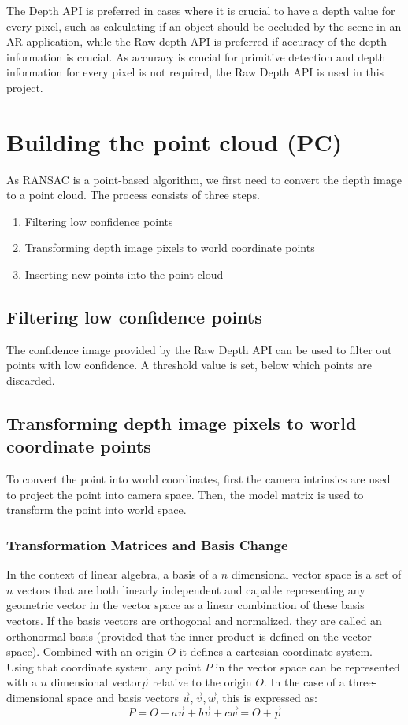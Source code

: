 

The Depth API is preferred in cases where it is crucial to have a depth value for every pixel, such as calculating if an object should be occluded by the scene in an AR application,
while the Raw depth API is preferred if accuracy of the depth information is crucial. \parencite{google_llc_arcore_doc}
As accuracy is crucial for primitive detection and depth information for every pixel is not required, the Raw Depth API is used in this project.


\section{Building the point cloud (PC)}
As RANSAC is a point-based algorithm, we first need to convert the depth image to a point cloud.
The process consists of three steps.
\begin{enumerate}
    \item Filtering low confidence points
    \item Transforming depth image pixels to world coordinate points
    \item Inserting new points into the point cloud
\end{enumerate}

\subsection{Filtering low confidence points}
The confidence image provided by the Raw Depth API can be used to filter out points with low confidence.
A threshold value is set, below which points are discarded.

\subsection{Transforming depth image pixels to world coordinate points}
To convert the point into world coordinates, first the camera intrinsics are used to
project the point into camera space.
Then, the model matrix is used to transform the point into world space.
\parencite{google_llc_codelab_raw_depth,google_llc_arcore_doc}

\subsubsection{Transformation Matrices and Basis Change}
In the context of linear algebra,
a basis of a $n$ dimensional vector space is a set of $n$ vectors that are both linearly independent
and capable representing any geometric vector in the vector space as a linear combination of these basis vectors.
If the basis vectors are orthogonal and normalized,
they are called an orthonormal basis (provided that the inner product is defined on the vector space).
Combined with an origin $O$ it defines a cartesian coordinate system.
Using that coordinate system, any point $P$ in the vector space can be represented with a $n$ dimensional vector$\vec{p}$ relative to the origin $O$.
In the case of a three-dimensional space and basis vectors $\vec{u}, \vec{v}, \vec{w}$, this is expressed as:
\begin{equation}
    P = O + a\vec{u} + b\vec{v} + c\vec{w} = O + \vec{p}
\end{equation}

